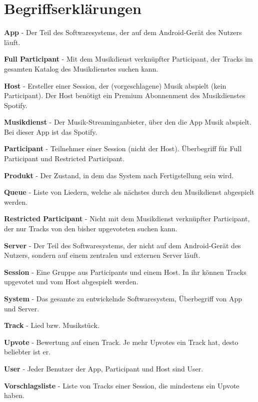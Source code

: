 \documentclass[oneside, ngerman]{sdqtechreport}
\begin{document}
\chapter{Begriffserklärungen}
\label{chap:Begriffserklärungen}

\textbf{App}
 - Der Teil des Softwaresystems, der auf dem Android-Gerät des Nutzers läuft.

 \textbf{Full Participant}
 - Mit dem Musikdienst verknüpfter Participant, der Tracks im gesamten Katalog des Musikdienstes suchen kann.

\textbf{Host}
 - Ersteller einer Session, der (vorgeschlagene) Musik abspielt (kein Participant). Der Host benötigt ein Premium Abonnenment des Musikdienstes Spotify.

 \textbf{Musikdienst}
 - Der Musik-Streaminganbieter, über den die App Musik abspielt. Bei dieser App ist das Spotify.

 \textbf{Participant}
 - Teilnehmer einer Session (nicht der Host). Überbegriff für Full Participant und Restricted Participant.

 \textbf{Produkt}
 - Der Zustand, in dem das System nach Fertigstellung sein wird.

 \textbf{Queue}
 - Liste von Liedern, welche als nächstes durch den Musikdienst abgespielt werden.

 \textbf{Restricted Participant}
 - Nicht mit dem Musikdienst verknüpfter Participant, der nur Tracks von den bisher upgevoteten suchen kann.

 \textbf{Server}
 - Der Teil des Softwaresystems, der nicht auf dem Android-Gerät des Nutzers, sondern auf einem zentralen und externen Server läuft.

 \textbf{Session}
 - Eine Gruppe aus Participants und einem Host. In ihr können Tracks upgevotet und vom Host abgespielt werden.

\textbf{System}
 - Das gesamte zu entwickelnde Softwaresystem, Überbegriff von App und Server.

 \textbf{Track}
 - Lied bzw. Musikstück.

 \textbf{Upvote}
 - Bewertung auf einen Track. Je mehr Upvotes ein Track hat, desto beliebter ist er.

 \textbf{User}
 - Jeder Benutzer der App, Participant und Host sind User.

 \textbf{Vorschlagsliste}
 - Liste von Tracks einer Session, die mindestens ein Upvote haben.
 
\end{document}
